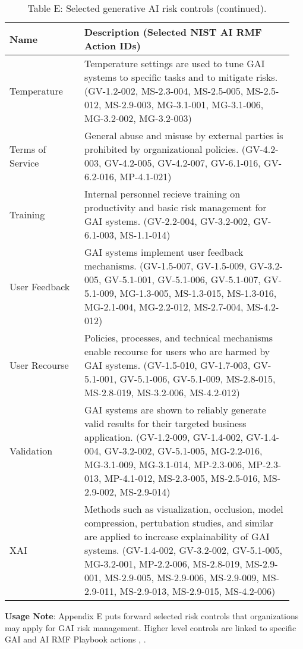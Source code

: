 \documentclass[fleqn]{article}
\begin{document}
\begin{table}[H]
	\caption*{Table E: Selected generative AI risk controls (continued).}
	\label{tab:controls_cont3}
	\footnotesize
	\begin{tabular}{|m{0.25\linewidth} |m{0.70\linewidth} |}
		\hline
		\textbf{Name} & \textbf{Description} (Selected NIST AI RMF Action IDs)\\
		\hline	
		Temperature & Temperature settings are used to tune GAI systems to specific tasks and to mitigate risks.  (GV-1.2-002, MS-2.3-004, MS-2.5-005, MS-2.5-012, MS-2.9-003, MG-3.1-001, MG-3.1-006, MG-3.2-002, MG-3.2-003) \\ 
		\hline	
		Terms of Service & General abuse and misuse by external parties is prohibited by organizational policies. (GV-4.2-003, GV-4.2-005, GV-4.2-007, GV-6.1-016, GV-6.2-016, MP-4.1-021)  \\ 
		\hline
		Training  & Internal personnel recieve training on productivity and basic risk management for GAI systems. (GV-2.2-004, GV-3.2-002, GV-6.1-003, MS-1.1-014)  \\ 
		\hline
		User Feedback & GAI systems implement user feedback mechanisms. (GV-1.5-007, GV-1.5-009, GV-3.2-005, GV-5.1-001, GV-5.1-006, GV-5.1-007, GV-5.1-009, MG-1.3-005, MS-1.3-015, MS-1.3-016, MG-2.1-004, MG-2.2-012, MS-2.7-004, MS-4.2-012)  \\ 
		\hline
		User Recourse & Policies, processes, and technical mechanisms enable recourse for users who are harmed by GAI systems. (GV-1.5-010, GV-1.7-003, GV-5.1-001, GV-5.1-006, GV-5.1-009, MS-2.8-015, MS-2.8-019, MS-3.2-006, MS-4.2-012) \\ 
		\hline
		Validation & GAI systems are shown to reliably generate valid results for their targeted business application. (GV-1.2-009, GV-1.4-002, GV-1.4-004, GV-3.2-002, GV-5.1-005,  MG-2.2-016, MG-3.1-009, MG-3.1-014, MP-2.3-006, MP-2.3-013, MP-4.1-012, MS-2.3-005, MS-2.5-016, MS-2.9-002, MS-2.9-014) \\ 
		\hline
		XAI & Methods such as visualization, occlusion, model compression, pertubation studies, and similar are applied to increase explainability of GAI systems. (GV-1.4-002, GV-3.2-002, GV-5.1-005, MG-3.2-001, MP-2.2-006, MS-2.8-019, MS-2.9-001, MS-2.9-005, MS-2.9-006, MS-2.9-009, MS-2.9-011, MS-2.9-013, MS-2.9-015, MS-4.2-006) \\ 
		\hline
	\end{tabular}
\end{table}

\noindent\textbf{Usage Note}: Appendix E puts forward selected risk controls that organizations may apply for GAI risk management. Higher level controls are linked to specific GAI and AI RMF Playbook actions \cite{ai600-1}, \cite{playbook}. 
\end{document}
